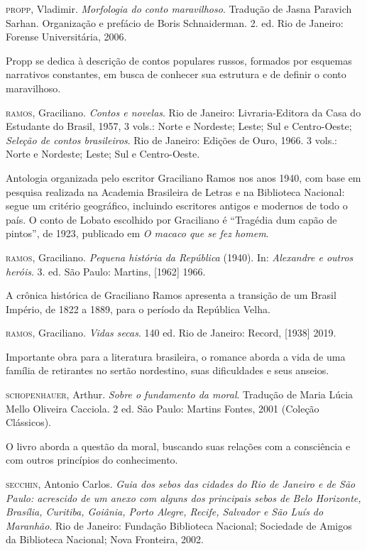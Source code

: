 \documentclass[11pt]{extarticle}
\begin{document}
\textsc{propp}, Vladimir. \emph{Morfologia do conto maravilhoso}. Tradução de
Jasna Paravich Sarhan. Organização e prefácio de Boris Schnaiderman. 2.
ed. Rio de Janeiro: Forense Universitária, 2006. 

Propp se dedica à descrição de contos populares russos, formados por esquemas narrativos
constantes, em busca de conhecer sua estrutura e de definir o conto
maravilhoso.

\textsc{ramos}, Graciliano. \emph{Contos e novelas}. Rio de Janeiro:
Livraria-Editora da Casa do Estudante do Brasil, 1957, 3 vols.: Norte e
Nordeste; Leste; Sul e Centro-Oeste; \emph{Seleção de contos
brasileiros}. Rio de Janeiro: Edições de Ouro, 1966. 3 vols.: Norte e
Nordeste; Leste; Sul e Centro-Oeste. 

Antologia organizada pelo escritor Graciliano Ramos nos anos 1940, com base em pesquisa 
realizada na Academia Brasileira de Letras e na Biblioteca Nacional: segue um
critério geográfico, incluindo escritores antigos e modernos de todo o
país. O conto de Lobato escolhido por Graciliano é ``Tragédia dum capão
de pintos'', de 1923, publicado em \emph{O macaco que se fez homem}.

\textsc{ramos}, Graciliano. \emph{Pequena história da República} (1940). In:
\emph{Alexandre e outros heróis}. 3. ed. São Paulo: Martins, {[}1962{]}
1966.

A crônica histórica de Graciliano Ramos apresenta a transição de um Brasil Império, 
de 1822 a 1889, para o período da República Velha.

\textsc{ramos}, Graciliano. \emph{Vidas secas}. 140 ed. Rio de Janeiro: Record,
{[}1938{]} 2019.

Importante obra para a literatura brasileira, o romance aborda a vida de uma 
família de retirantes no sertão nordestino, suas dificuldades e seus anseios.

\textsc{schopenhauer}, Arthur. \emph{Sobre o fundamento da moral}. Tradução de
Maria Lúcia Mello Oliveira Cacciola. 2 ed. São Paulo: Martins Fontes,
2001 (Coleção Clássicos).

O livro aborda a questão da moral, buscando suas relações com a consciência e 
com outros princípios do conhecimento.

\textsc{secchin}, Antonio Carlos. \emph{Guia dos sebos das cidades do Rio de
Janeiro e de São Paulo: acrescido de um anexo com alguns dos principais
sebos de Belo Horizonte, Brasília, Curitiba, Goiânia, Porto Alegre,
Recife, Salvador e São Luís do Maranhão}. Rio de Janeiro: Fundação
Biblioteca Nacional; Sociedade de Amigos da Biblioteca Nacional; Nova
Fronteira, 2002.
\end{document}
